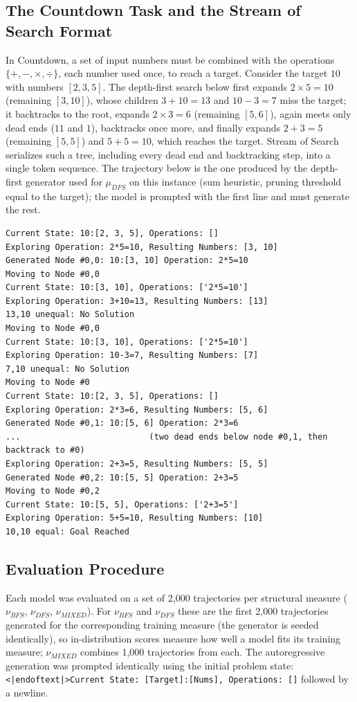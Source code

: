\subsection{The Countdown Task and the Stream of Search Format} %
\label{app:countdown_example}
In Countdown, a set of input numbers must be combined with the operations $\{+,-,\times,\div\}$, each number used once, to reach a target. Consider the target $10$ with numbers $[2,3,5]$. The depth-first search below first expands $2\times5=10$ (remaining $[3,10]$), whose children $3+10=13$ and $10-3=7$ miss the target; it backtracks to the root, expands $2\times3=6$ (remaining $[5,6]$), again meets only dead ends ($11$ and $1$), backtracks once more, and finally expands $2+3=5$ (remaining $[5,5]$) and $5+5=10$, which reaches the target. Stream of Search \citep{gandhi2024streamsearchsoslearning} serializes such a tree, including every dead end and backtracking step, into a single token sequence. The trajectory below is the one produced by the depth-first generator used for $\mu_{DFS}$ on this instance (sum heuristic, pruning threshold equal to the target); the model is prompted with the first line and must generate the rest.
{\footnotesize
\begin{verbatim}
Current State: 10:[2, 3, 5], Operations: []
Exploring Operation: 2*5=10, Resulting Numbers: [3, 10]
Generated Node #0,0: 10:[3, 10] Operation: 2*5=10
Moving to Node #0,0
Current State: 10:[3, 10], Operations: ['2*5=10']
Exploring Operation: 3+10=13, Resulting Numbers: [13]
13,10 unequal: No Solution
Moving to Node #0,0
Current State: 10:[3, 10], Operations: ['2*5=10']
Exploring Operation: 10-3=7, Resulting Numbers: [7]
7,10 unequal: No Solution
Moving to Node #0
Current State: 10:[2, 3, 5], Operations: []
Exploring Operation: 2*3=6, Resulting Numbers: [5, 6]
Generated Node #0,1: 10:[5, 6] Operation: 2*3=6
...                          (two dead ends below node #0,1, then backtrack to #0)
Exploring Operation: 2+3=5, Resulting Numbers: [5, 5]
Generated Node #0,2: 10:[5, 5] Operation: 2+3=5
Moving to Node #0,2
Current State: 10:[5, 5], Operations: ['2+3=5']
Exploring Operation: 5+5=10, Resulting Numbers: [10]
10,10 equal: Goal Reached
\end{verbatim}
}

\subsection{Evaluation Procedure}

Each model was evaluated on a set of 2,000 trajectories per structural measure ($\nu_{BFS}$, $\nu_{DFS}$, $\nu_{MIXED}$). For $\nu_{BFS}$ and $\nu_{DFS}$ these are the first 2,000 trajectories generated for the corresponding training measure (the generator is seeded identically), so in-distribution scores measure how well a model fits its training measure; $\nu_{MIXED}$ combines 1,000 trajectories from each. %
 The autoregressive generation was prompted identically using the initial problem state: \texttt{<|endoftext|>Current State: [Target]:[Nums], Operations: []} followed by a newline. %

